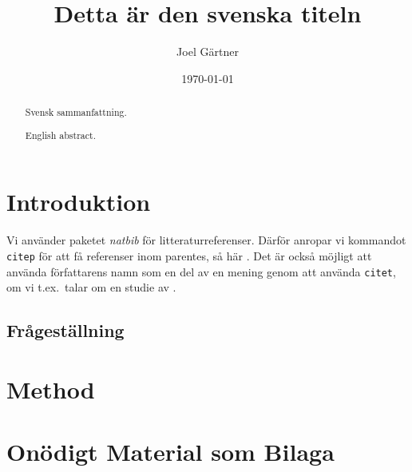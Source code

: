 \documentclass[swedish]{kththesis}
\title{Detta är den svenska titeln}
\author{Joel Gärtner}
\date{\today}
\begin{document}
\flyleaf

\begin{abstract}
  Svensk sammanfattning.
  \lipsum[1-2]
\end{abstract}

\clearpage

\begin{otherlanguage}{english}
  \begin{abstract}
  English abstract.
  \lipsum[3-4]
  \end{abstract}
\end{otherlanguage}

\cleardoublepage

\tableofcontents


\mainmatter


\chapter{Introduktion}

Vi använder paketet \emph{natbib} för litteraturreferenser.  Därför
anropar vi kommandot \texttt{citep} för att få referenser inom
parentes, så här \citep{heisenberg2015}.  Det är också möjligt att använda
författarens namn som en del av en mening genom att använda
\texttt{citet}, om vi t.ex.\ talar om en studie av \citet{einstein2016}.

\lipsum

\section{Frågeställning}

\lipsum[6]

\chapter{Method}

\lipsum



\appendix

\chapter{Onödigt Material som Bilaga}
\end{document}
